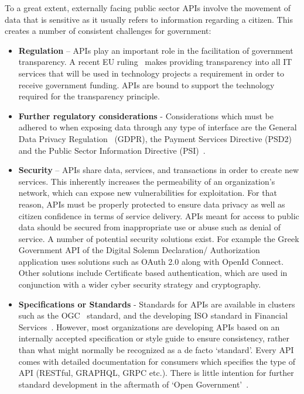 To a great extent, externally facing public sector APIs involve the movement
of data that is sensitive as it usually refers to information regarding
a citizen. This creates a number of consistent challenges for government:
\begin{itemize}
	\item \textbf{Regulation} – APIs play an important role in the facilitation of
	government transparency. A recent EU ruling~\citep{eu_funding} makes providing
	transparency into all IT services that will be used in technology projects
	a requirement in order to receive government funding. APIs are bound to support the
	technology required for the transparency principle.
	
	\item \textbf{Further regulatory considerations} - Considerations which
	must be adhered to when	exposing data through any type of interface are
	the General Data Privacy Regulation~\cite{eu_gdpr} (GDPR), the Payment
	Services Directive	(PSD2)~\citep{eu_payment_directives} and the Public Sector Information
	Directive (PSI)~\citep{public_sector_info}.
	
	\item \textbf{Security} – APIs share data, services, and transactions in order to create new services. This inherently increases the permeability of an
	organization’s network, which can expose new vulnerabilities for
	exploitation. For that reason, APIs must be properly protected to ensure data
	privacy as well as citizen confidence in terms of service delivery.
	APIs meant for access to public data should be secured from inappropriate
	use or abuse such as denial of service. A number of potential security solutions exist.
	For example the Greek Government API of the Digital Solemn Declaration/ Authorization
	application uses solutions such as OAuth 2.0 along with OpenId Connect. Other solutions
	include Certificate based authentication, which are used in conjunction with a wider cyber security strategy and cryptography.

	
	\item \textbf{Specifications or Standards} - Standards for APIs are available in
	clusters such as the OGC~\citep{open_geospatial_consortium} standard, and the developing ISO
	standard in Financial Services~\cite{iso}. However, most organizations are
	developing APIs based on an internally accepted specification or style guide
	to ensure consistency, rather than what might normally be recognized as
	a de facto ‘standard’. Every API comes with detailed documentation for
	consumers which	specifies the type of API	(RESTful, GRAPHQL,
	GRPC etc.). There is little intention for further standard
	development in the aftermath of ‘Open Government’~\citep{interface_standardisation}.
\end{itemize}

